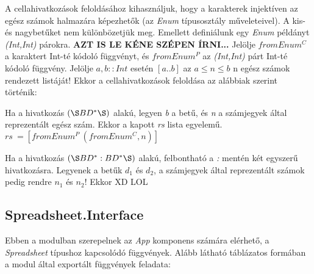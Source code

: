 A cellahivatkozások feloldásához kihasználjuk, hogy a karakterek injektíven az egész számok halmazára képezhetők (az \textit{Enum} típusosztály műveleteivel). A kis- és nagybetűket nem különbözetjük meg. Emellett definiálunk egy \textit{Enum} példányt \textit{(Int,Int)} párokra. \textbf{AZT IS LE KÉNE SZÉPEN ÍRNI...} Jelölje $fromEnum^C$ a karaktert Int-té kódoló függvényt, és $fromEnum^P$ az \textit{(Int,Int)} párt Int-té kódoló függvény. Jelölje $a,b :: Int$ esetén $[a..b]$ az $a \le n \le b$ n egész számok rendezett listáját! Ekkor a cellahivatkozások feloldása az alábbiak szerint történik:
\begin{compactenum}
	\item Ha a hivatkozás $(\S BD^*\S )$ alakú, legyen \textit{b} a betű, és \textit{n} a számjegyek által reprezentált egész szám. Ekkor a kapott  \textit{rs} lista egyelemű. $rs\ = [fromEnum^P\ (fromEnum^C,n)]$
	\item Ha a hivatkozás $(\S  BD^*:BD^*\S )$ alakú, felbontható a \textit{:} mentén két egyszerű hivatkozásra. Legyenek a betűk $d_1$ és $d_2$, a számjegyek által reprezentált számok pedig rendre $n_1$ és $n_2$! Ekkor XD LOL 
\end{compactenum}

\subsection{Spreadsheet.Interface}

Ebben a modulban szerepelnek az \textit{App} komponens számára elérhető, a \textit{Spreadsheet} típushoz kapcsolódó függvények. Alább látható táblázatos formában a modul által exportált függvények feladata:

